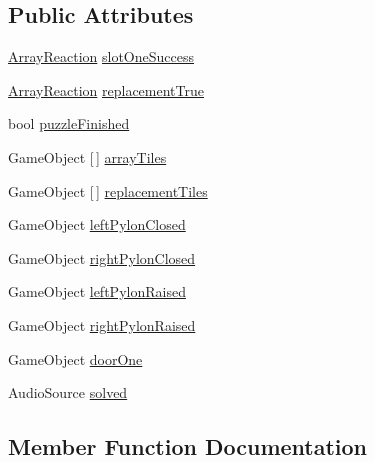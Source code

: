 \subsection*{Public Attributes}
\begin{DoxyCompactItemize}
\item 
\hyperlink{class_array_reaction}{Array\+Reaction} \hyperlink{class_logical_and_completion_a7ed4ecdaf29b98fa3264c51a64eb726e}{slot\+One\+Success}
\item 
\hyperlink{class_array_reaction}{Array\+Reaction} \hyperlink{class_logical_and_completion_a925f99929d6fe0f68f245914fb0e1e95}{replacement\+True}
\item 
bool \hyperlink{class_logical_and_completion_a5bff7c897b4ebfca7d56e238917de8e4}{puzzle\+Finished}
\item 
Game\+Object \mbox{[}$\,$\mbox{]} \hyperlink{class_logical_and_completion_a1d6d43ba546c81e5b9c5cda3837be009}{array\+Tiles}
\item 
Game\+Object \mbox{[}$\,$\mbox{]} \hyperlink{class_logical_and_completion_a9dd15007bbc76569e7c82904c2464124}{replacement\+Tiles}
\item 
Game\+Object \hyperlink{class_logical_and_completion_af6e487086d828fe81dc8890754f32c38}{left\+Pylon\+Closed}
\item 
Game\+Object \hyperlink{class_logical_and_completion_ad50f71a4157df3e8ca40c98eada1d3fb}{right\+Pylon\+Closed}
\item 
Game\+Object \hyperlink{class_logical_and_completion_a803aec34894a6af536b64611019c6372}{left\+Pylon\+Raised}
\item 
Game\+Object \hyperlink{class_logical_and_completion_a49166cfb32e7409ba04133c408d47793}{right\+Pylon\+Raised}
\item 
Game\+Object \hyperlink{class_logical_and_completion_a95b8a1803a7ce81d2d45f88b036e7f9e}{door\+One}
\item 
Audio\+Source \hyperlink{class_logical_and_completion_a2cf6ce1f33f9c648fa21cb6b97e785b3}{solved}
\end{DoxyCompactItemize}


\subsection{Member Function Documentation}
\mbox{\label{class_logical_and_completion_a6474fb7522f26a6cc7a0a5ce3965fffd}} 
